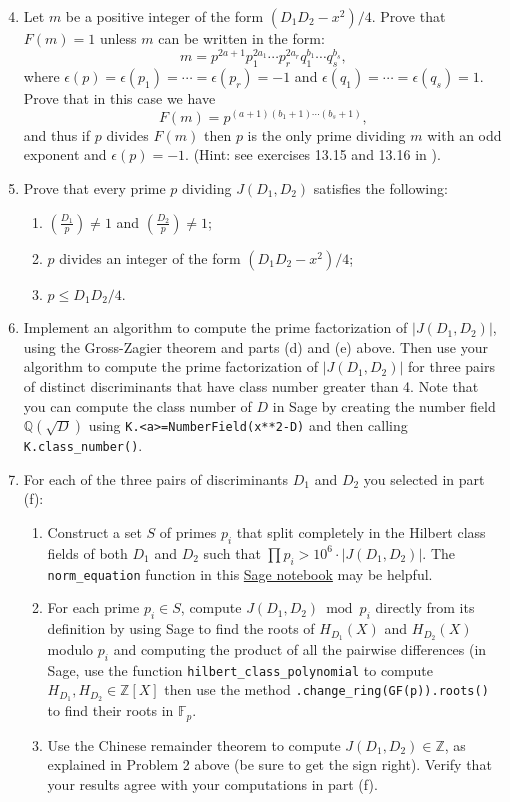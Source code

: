 \documentclass[11pt]{article}
\newcommand{\Fp}{\mathbb{F}_p}
\newcommand{\Q}{\mathbb{Q}}
\newcommand{\Z}{\mathbb{Z}}
\begin{document}
\begin{enumerate}[{\bf (a)}]
\setcounter{enumi}{3}
\item Let $m$ be a positive integer of the form $(D_1D_2-x^2)/4$.
Prove that $F(m)=1$ unless $m$ can be written in the form:
\[
m = p^{2a+1}p_1^{2a_1}\cdots p_r^{2a_r}q_1^{b_1}\cdots q_s^{b_s},
\]
where $\epsilon(p)=\epsilon(p_1)=\cdots =\epsilon(p_r) = -1$ and $\epsilon(q_1)=\cdots=\epsilon(q_s)=1$.  Prove that in this case we have
\[
F(m) = p^{(a+1)(b_1+1)\cdots(b_s+1)},
\]
and thus if $p$ divides $F(m)$ then $p$ is the only prime dividing $m$ with an odd exponent and $\epsilon(p)=-1$.
(Hint: see exercises 13.15 and 13.16 in \cite{cox}).

\item Prove that every prime $p$ dividing $J(D_1,D_2)$ satisfies the following:
\begin{enumerate}[{\bf (i)}]
\item $\left(\frac{D_1}{p}\right) \ne 1$ and $\left(\frac{D_2}{p}\right)\ne 1$;
\item $p$ divides an integer of the form $(D_1D_2-x^2)/4$;
\item $p\le D_1D_2/4$.
\end{enumerate}

\item Implement an algorithm to compute the prime factorization of $|J(D_1,D_2)|$, using the Gross-Zagier theorem and parts (d) and (e) above.  Then use your algorithm to compute the prime factorization of $|J(D_1,D_2)|$ for three pairs of distinct discriminants that have class number greater than 4.
Note that you can compute the class number of $D$ in Sage by creating the number field $\Q(\sqrt{D})$ using \texttt{K.<a>=NumberField(x**2-D)} and then calling \texttt{K.class\_number()}.

\item For each of the three pairs of discriminants $D_1$ and $D_2$ you selected in part (f):
\begin{enumerate}[{\bf(1)}]
\item Construct a set $S$ of primes $p_i$ that split completely in the Hilbert class fields of both $D_1$ and $D_2$ such that $\prod p_i > 10^6\cdot |J(D_1,D_2)|$.
The \texttt{norm\_equation} function in this \href{https://cocalc.com/share/public_paths/4283f59e7b759b1779c3a6689ed086de9b425835}{Sage notebook} may be helpful.
\item For each prime $p_i\in S$, compute $J(D_1,D_2)\bmod p_i$ directly from its definition by using Sage to find the roots of $H_{D_1}(X)$ and $H_{D_2}(X)$ modulo $p_i$ and computing the product of all the pairwise differences (in Sage, use the function \texttt{hilbert\_class\_polynomial} to compute $H_{D_1},H_{D_2}\in\Z[X]$ then use the method \texttt{.change\_ring(GF(p)).roots()} to find their roots in $\Fp$.
\item Use the Chinese remainder theorem to compute $J(D_1,D_2)\in\Z$, as explained in Problem 2 above (be sure to get the sign right).
Verify that your results agree with your computations in part (f).
\end{enumerate}
\end{enumerate}
\end{document}
